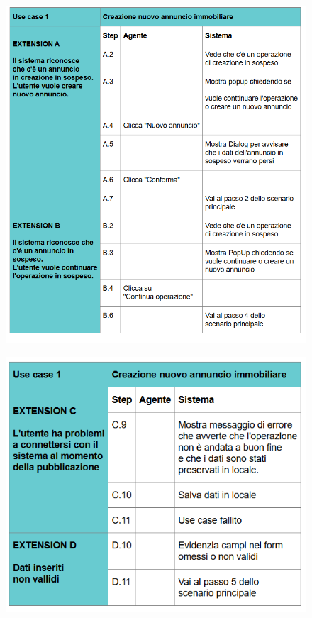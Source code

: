 \begin{figure}[H]
	\centering
	\includegraphics[width=1\linewidth]{"Immagini/cockburn/nuovo annuncio estensioni 1.png"}
	\caption[CockBurn extensions: registra nuovo annuncio]{}
	\label{fig:registra-nuovo-annuncio-extensions1}
\end{figure}

\newpage

\begin{figure}[H]
	\centering
	\includegraphics[width=1\linewidth]{"Immagini/cockburn/nuovo annuncio estensioni 2.png"}
	\caption[CockBurn extensions: registra nuovo annuncio]{}
	\label{fig:registra-nuovo-annuncio-extensions2}
\end{figure}